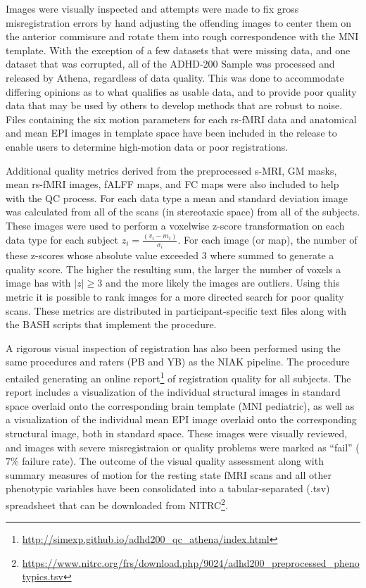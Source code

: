 \documentclass[preprint,12pt,3p]{elsarticle}
\begin{document}
Images were visually inspected and attempts were made to fix gross misregistration errors by hand adjusting the offending images to center them on the anterior commisure and rotate them into rough correspondence with the MNI template. With the exception of a few datasets that were missing data, and one dataset that was corrupted, all of the ADHD-200 Sample was processed and released by Athena, regardless of data quality. This was done to accommodate differing opinions as to what qualifies as usable data, and to provide poor quality data that may be used by others to develop methods that are robust to noise. Files containing the six motion parameters for each rs-fMRI data and anatomical and mean EPI images in template space have been included in the release to enable users to determine high-motion data or poor registrations.
\par
Additional quality metrics derived from the preprocessed s-MRI, GM masks, mean rs-fMRI images, fALFF maps, and FC maps were also included to help with the QC process. For each data type a mean and standard deviation image was calculated from all of the scans (in stereotaxic space) from all of the subjects. These images were used to perform a voxelwise z-score transformation on each data type for each subject $z_i = \frac{(v_i-m_i)}{\sigma_i}$. For each image (or map), the number of these z-scores whose absolute value exceeded 3 where summed to generate a quality score. The higher the resulting sum, the larger the number of voxels a image has with $\left|z\right| \geq 3$ and the more likely the images are outliers. Using this metric it is possible to rank images for a more directed search for poor quality scans. These metrics are distributed in participant-specific text files along with the BASH scripts that implement the procedure.
\par
A rigorous visual inspection of registration has also been performed using the same procedures and raters (PB and YB) as the NIAK pipeline. The procedure entailed generating an online report\footnote{\url{http://simexp.github.io/adhd200_qc_athena/index.html}} of registration quality for all subjects.  The report includes a visualization of the individual structural images in standard space overlaid onto the corresponding brain template (MNI pediatric), as well as a visualization of the individual mean EPI image overlaid onto the corresponding structural image, both in standard space. These images were visually reviewed, and images with severe misregistraion or quality problems were marked as ``fail'' ($7\%$ failure rate). The outcome of the visual quality assessment along with summary measures of motion for the resting state fMRI scans and all other phenotypic variables have been consolidated into a tabular-separated (.tsv) spreadsheet that can be downloaded from NITRC\footnote{\url{https://www.nitrc.org/frs/download.php/9024/adhd200_preprocessed_phenotypics.tsv}}.
\end{document}
